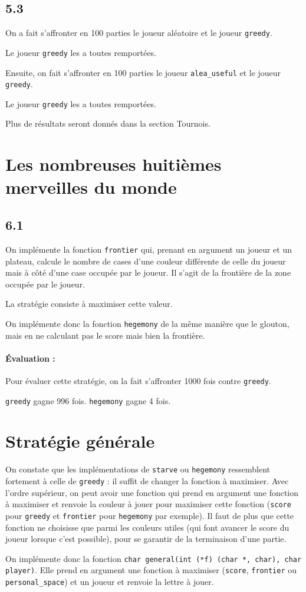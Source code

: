 \documentclass[12pt]{article}
\def\question#1{\subsection*{#1}}
\def\sec#1{\section{#1}}
\begin{document}
\question{5.3}
On a fait s'affronter en 100 parties le joueur aléatoire et le joueur \texttt{greedy}.

Le joueur \texttt{greedy} les a toutes remportées.

Ensuite, on fait s'affronter en 100 parties le joueur \texttt{alea\_useful} et le joueur \texttt{greedy}.

Le joueur \texttt{greedy} les a toutes remportées.

Plus de résultats seront donnés dans la section Tournois.

\sec{Les nombreuses huitièmes merveilles du monde}

\question{6.1}
On implémente la fonction \texttt{frontier} qui, prenant en argument un joueur et un plateau, calcule le nombre de cases d'une couleur différente de celle du joueur mais à côté d'une case occupée par le joueur. 
Il s'agit de la frontière de la zone occupée par le joueur.

La stratégie consiste à maximiser cette valeur.

On implémente donc la fonction \texttt{hegemony} de la même manière que le glouton, mais en ne calculant pas le score mais bien la frontière.



\paragraph{Évaluation :}
Pour évaluer cette stratégie, on la fait s'affronter 1000 fois contre \texttt{greedy}.

\texttt{greedy} gagne 996 fois. \texttt{hegemony} gagne 4 fois. 

\sec{Stratégie générale} 
On constate que les implémentations de \texttt{starve} ou \texttt{hegemony} ressemblent fortement à celle de \texttt{greedy} : il suffit de changer la fonction à maximiser. Avec l'ordre supérieur, on peut avoir une fonction qui prend en argument une fonction à maximiser et renvoie la couleur à jouer pour maximiser cette fonction (\texttt{score} pour \texttt{greedy} et \texttt{frontier} pour \texttt{hegemony} par exemple). Il faut de plus que cette fonction ne choisisse que parmi les couleurs utiles (qui font avancer le score du joueur lorsque c'est possible), pour se garantir de la terminaison d'une partie.

On implémente donc la fonction \texttt{char general(int (*f) (char *, char), char player)}. Elle prend en argument une fonction à maximiser (\texttt{score}, \texttt{frontier} ou \texttt{personal\_space}) et un joueur et renvoie la lettre à jouer. 
\end{document}
